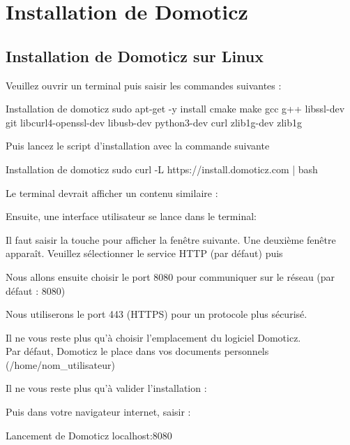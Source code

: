 
\chapter{Installation de Domoticz}
\section{Installation de Domoticz sur Linux}

Veuillez ouvrir un terminal puis saisir les commandes suivantes : 

\begin{Bash}{Installation de domoticz}
sudo apt-get -y install cmake make gcc g++ libssl-dev git libcurl4-openssl-dev libusb-dev python3-dev curl zlib1g-dev zlib1g
\end{Bash}

Puis lancez le script d'installation avec la commande suivante

\begin{Bash}{Installation de domoticz}
  sudo curl -L https://install.domoticz.com | bash
\end{Bash}

Le terminal devrait afficher un contenu similaire : 


Ensuite, une interface utilisateur se lance dans le terminal:



Il faut saisir la touche  pour afficher la fenêtre suivante.
Une deuxième fenêtre apparaît. Veuillez sélectionner le service HTTP (par défaut) puis 


Nous allons ensuite choisir le port 8080 pour communiquer sur le réseau (par défaut : 8080)


Nous utiliserons le port 443 (HTTPS) pour un protocole plus sécurisé.


Il ne vous reste plus qu'à choisir l'emplacement du logiciel Domoticz.\\
Par défaut, Domoticz le place dans vos documents personnels (/home/nom\_utilisateur)


Il ne vous reste plus qu'à valider l'installation : 


Puis dans votre navigateur internet, saisir :

\begin{Bash}{Lancement de Domoticz}
  localhost:8080
\end{Bash}





